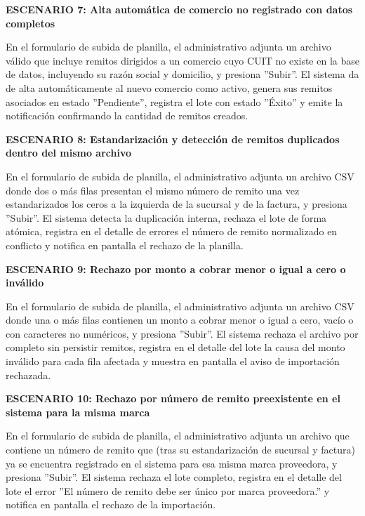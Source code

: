 \documentclass[a4paper,9pt]{article}
\begin{document}
\begin{tcolorbox}[hucard, title={\textbf{HU-2: IMPORTAR PLANILLA DE REMITOS} \hfill \scriptsize \colorbox{tealstatus}{\textbf{\ Accepted\ }} \quad \colorbox{white}{\textcolor{primarydark}{\textbf{\ 5 pts\ }}}}]
{\noindent\textbf{\textcolor{secondarydark}{ESCENARIO 7:  Alta automática de comercio no registrado con datos completos}}\par\vspace{1pt}
En el formulario de subida de planilla, el administrativo adjunta un archivo válido que incluye remitos dirigidos a un comercio cuyo CUIT no existe en la base de datos, incluyendo su razón social y domicilio, y presiona ''Subir''. El sistema da de alta automáticamente al nuevo comercio como activo, genera sus remitos asociados en estado ''Pendiente'', registra el lote con estado ''Éxito'' y emite la notificación confirmando la cantidad de remitos creados.\par\vspace{2.5pt}
\noindent\textbf{\textcolor{secondarydark}{ESCENARIO 8:  Estandarización y detección de remitos duplicados dentro del mismo archivo}}\par\vspace{1pt}
En el formulario de subida de planilla, el administrativo adjunta un archivo CSV donde dos o más filas presentan el mismo número de remito una vez estandarizados los ceros a la izquierda de la sucursal y de la factura, y presiona ''Subir''. El sistema detecta la duplicación interna, rechaza el lote de forma atómica, registra en el detalle de errores el número de remito normalizado en conflicto y notifica en pantalla el rechazo de la planilla.\par\vspace{2.5pt}
\noindent\textbf{\textcolor{secondarydark}{ESCENARIO 9:  Rechazo por monto a cobrar menor o igual a cero o inválido}}\par\vspace{1pt}
En el formulario de subida de planilla, el administrativo adjunta un archivo CSV donde una o más filas contienen un monto a cobrar menor o igual a cero, vacío o con caracteres no numéricos, y presiona ''Subir''. El sistema rechaza el archivo por completo sin persistir remitos, registra en el detalle del lote la causa del monto inválido para cada fila afectada y muestra en pantalla el aviso de importación rechazada.\par\vspace{2.5pt}
\noindent\textbf{\textcolor{secondarydark}{ESCENARIO 10:  Rechazo por número de remito preexistente en el sistema para la misma marca}}\par\vspace{1pt}
En el formulario de subida de planilla, el administrativo adjunta un archivo que contiene un número de remito que (tras su estandarización de sucursal y factura) ya se encuentra registrado en el sistema para esa misma marca proveedora, y presiona ''Subir''. El sistema rechaza el lote completo, registra en el detalle del lote el error ''El número de remito debe ser único por marca proveedora.'' y notifica en pantalla el rechazo de la importación.\par\vspace{2.5pt}
}
\end{tcolorbox}
\end{document}
